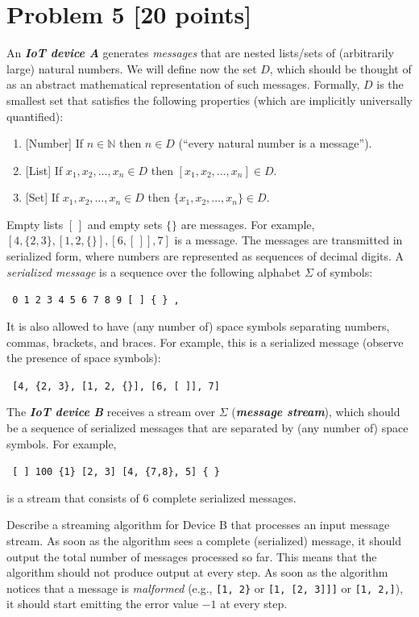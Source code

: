 \documentclass[11pt]{article}
\newcommand{\N}{\mathbb{N}}
\begin{document}
\newpage
\section*{Problem 5 [20 points]}

An \textbf{\em IoT device A} generates \emph{messages} that are nested lists/sets of (arbitrarily large) natural numbers. We will define now the set $D$, which should be thought of as an abstract mathematical representation of such messages. Formally, $D$ is the smallest set that satisfies the following properties (which are implicitly universally quantified):
\begin{enumerate}
\item{}
[Number] If $n \in \N$ then $n \in D$ (``every natural number is a message'').
\item{}
[List] If $x_1, x_2, \ldots, x_n \in D$ then $[x_1, x_2, \ldots, x_n] \in D$.
\item{}
[Set] If $x_1, x_2, \ldots, x_n \in D$ then $\{ x_1, x_2, \ldots, x_n \} \in D$.
\end{enumerate}
Empty lists $[\,]$ and empty sets $\{ \}$ are messages. For example, $[ 4, \{ 2, 3 \}, [1, 2, \{ \} ], [6, [\,]], 7 ]$ is a message.
%
The messages are transmitted in serialized form, where numbers are represented as sequences of decimal digits. A \emph{serialized message} is a sequence over the following alphabet $\Sigma$ of symbols:
\begin{center}
\tt
0 1 2 3 4 5 6 7 8 9 [ ] \{ \} ,
\end{center}
It is also allowed to have (any number of) space symbols separating numbers, commas, brackets, and braces. For example, this is a serialized message (observe the presence of space symbols):
\begin{center}
\tt
[4, \{2, 3\}, [1, 2, \{\}], [6, [\,]], 7]
\end{center}
The \textbf{\em IoT device B} receives a stream over $\Sigma$ (\textbf{\em message stream}), which should be a sequence of serialized messages that are separated by (any number of) space symbols. For example,
\begin{center}
\tt
[ ] 100 \{1\} [2, 3] [4, \{7,8\}, 5] \{ \}
\end{center}
is a stream that consists of 6 complete serialized messages.

Describe a streaming algorithm for Device B that processes an input message stream. As soon as the algorithm sees a complete (serialized) message, it should output the total number of messages processed so far. This means that the algorithm should not produce output at every step. As soon as the algorithm notices that a message is \emph{malformed} (e.g., \texttt{[1, 2\}} or \texttt{[1, [2, 3]]]} or \texttt{[1, 2,]}), it should start emitting the error value $-1$ at every step.
\end{document}
